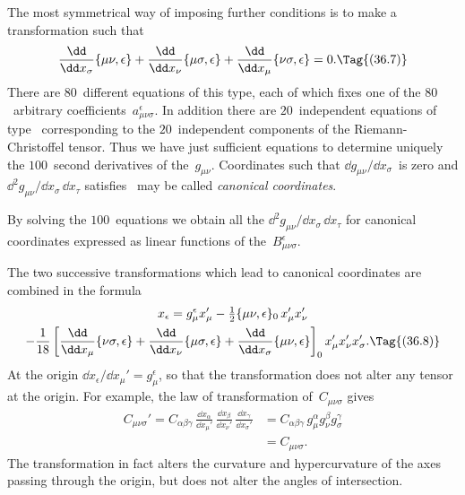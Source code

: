 \documentclass[12pt]{book}
\begin{document}
The most symmetrical way of imposing further conditions is to make a
transformation such that
\[
\frac{\dd}{\dd x_{\sigma}} \{\mu\nu, \epsilon\}
+ \frac{\dd}{\dd x_{\nu}} \{\mu\sigma, \epsilon\}
+ \frac{\dd}{\dd x_{\mu}} \{\nu\sigma, \epsilon\} = 0.
\Tag{(36.7)}
\]
There are $80$~different equations of this type, each of which fixes one of the
$80$~arbitrary coefficients~$a_{\mu\nu\sigma}^{\epsilon}$. In addition there are $20$~independent equations
of type~ corresponding to the $20$~independent components of the
Riemann-Christoffel tensor. Thus we have just sufficient equations to determine
uniquely the $100$~second derivatives of the~$g_{\mu\nu}$. Coordinates such that
$\dd g_{\mu\nu}/\dd x_{\sigma}$~is zero and $\dd^{2} g_{\mu\nu}/\dd x_{\sigma}\, \dd x_{\tau}$ satisfies~ may be called \emph{canonical
coordinates}.

By solving the $100$~equations we obtain all the $\dd^{2} g_{\mu\nu}/\dd x_{\sigma}\, \dd x_{\tau}$ for canonical
coordinates expressed as linear functions of the~$B_{\mu\nu\sigma}^{\epsilon}$.

The two successive transformations which lead to canonical coordinates
%
%
%
are combined in the formula
\begin{multline*}
  x_{\epsilon} = g_{\mu}^{\epsilon} x_{\mu}'
  - \tfrac{1}{2}\{\mu\nu, \epsilon\}_{0}\, x_{\mu}' x_{\nu}' \\
  - \frac{1}{18}\left[\frac{\dd}{\dd x_{\mu}}\{\nu\sigma, \epsilon\}
                    + \frac{\dd}{\dd x_{\nu}} \{\mu\sigma, \epsilon\}
                    + \frac{\dd}{\dd x_{\sigma}} \{\mu\nu, \epsilon\}\right]_{0}
  x_{\mu}' x_{\nu}' x_{\sigma}'.
  \Tag{(36.8)}
\end{multline*}
At the origin $\dd x_{\epsilon}/\dd x_{\mu}' = g_{\mu}^{\epsilon}$, so that the transformation does not alter any
tensor at the origin. For example, the law of transformation of~$C_{\mu\nu\sigma}$ gives
\begin{align*}
  C_{\mu\nu\sigma}'
  = C_{\alpha\beta\gamma}\, \frac{\dd x_{\alpha}}{\dd x_{\mu}'}\,
  \frac{\dd x_{\beta}}{\dd x_{\nu}'}\,
  \frac{\dd x_{\gamma}}{\dd x_{\sigma}'}
  &= C_{\alpha\beta\gamma}\, g_{\mu}^{\alpha} g_{\nu}^{\beta} g_{\sigma}^{\gamma} \\
  &= C_{\mu\nu\sigma}.
\end{align*}
The transformation in fact alters the curvature and hypercurvature of the
axes passing through the origin, but does not alter the angles of intersection.
\end{document}
